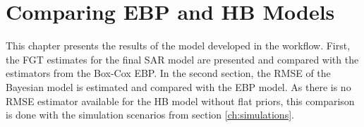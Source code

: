 \chapter{Comparing EBP and HB Models}

This chapter presents the results of the model developed in the workflow.
First, the FGT estimates for the final SAR model are presented and compared with the estimators from the Box-Cox EBP.
In the second section, the RMSE of the Bayesian model is estimated and compared with the EBP model.
As there is no RMSE estimator available for the HB model without flat priors, this comparison is done with the simulation scenarios from section \ref{ch:simulations}.









